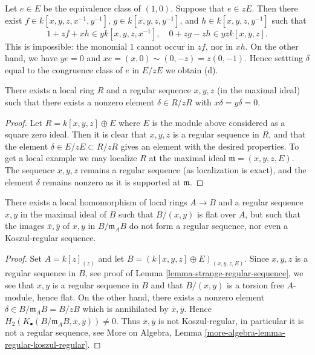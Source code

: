 \medskip\noindent
Let $e \in E$ be the equivalence class of $(1, 0)$.
Suppose that $e \in zE$. Then there exist $f \in k[x, y, z, x^{-1}, y^{-1}]$,
$g \in k[x, y, z, y^{-1}]$, and $h \in k[x, y, z, y^{-1}]$ such that
$$
1 + zf + xh \in yk[x, y, z, x^{-1}], \quad
0 + zg - zh \in yzk[x, y, z].
$$
This is impossible: the monomial $1$ cannot occur in
$zf$, nor in $xh$. On the other hand, we have $ye = 0$ and
$xe = (x, 0) \sim (0, -z) = z(0, -1)$. Hence settting $\delta$
equal to the congruence class of $e$ in $E/zE$ we obtain (d).

\begin{lemma}
\label{lemma-strange-regular-sequence}
There exists a local ring $R$ and a regular sequence $x, y, z$
(in the maximal ideal) such that there exists a nonzero element
$\delta \in R/zR$ with $x\delta = y\delta = 0$.
\end{lemma}

\begin{proof}
Let $R = k[x, y, z] \oplus E$ where $E$ is the module above considered
as a square zero ideal. Then it is clear that $x, y, z$ is a regular
sequence in $R$, and that the element $\delta \in E/zE \subset R/zR$
gives an element with the desired properties. To get a local example
we may localize $R$ at the maximal ideal $\mathfrak m = (x, y, z, E)$.
The sequence $x, y, z$ remains a regular sequence (as localization is
exact), and the element $\delta$ remains nonzero as it is supported
at $\mathfrak m$.
\end{proof}

\begin{lemma}
\label{lemma-base-change-regular-sequence}
There exists a local homomorphism of local rings $A \to B$
and a regular sequence $x, y$ in the maximal ideal of $B$ such that
$B/(x, y)$ is flat over $A$, but such that the images
$\overline{x}, \overline{y}$ of $x, y$ in $B/\mathfrak m_AB$ do not
form a regular sequence, nor even a Koszul-regular sequence.
\end{lemma}

\begin{proof}
Set $A = k[z]_{(z)}$ and let $B = (k[x, y, z] \oplus E)_{(x, y, z, E)}$.
Since $x, y, z$ is a regular sequence in $B$, see proof of
Lemma \ref{lemma-strange-regular-sequence},
we see that $x, y$ is a regular sequence in $B$ and that
$B/(x, y)$ is a torsion free $A$-module, hence flat.
On the other hand, there exists a nonzero element
$\delta \in B/\mathfrak m_AB = B/zB$ which is annihilated
by $\overline{x}, \overline{y}$. Hence
$H_2(K_\bullet(B/\mathfrak m_AB, \overline{x}, \overline{y})) \not = 0$.
Thus $\overline{x}, \overline{y}$ is not Koszul-regular, in particular
it is not a regular sequence, see
More on Algebra, Lemma \ref{more-algebra-lemma-regular-koszul-regular}.
\end{proof}





